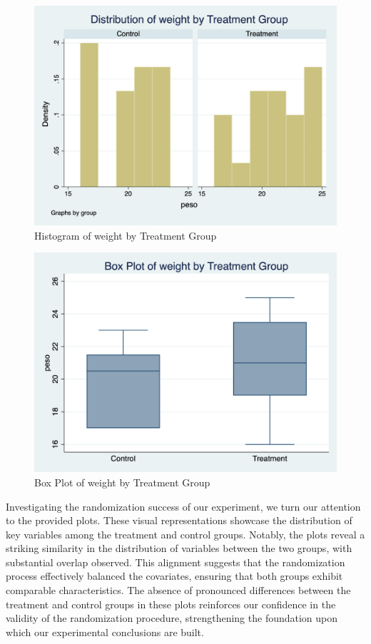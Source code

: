 \documentclass{article}
\begin{document}
\begin{figure}[!h]
\centering
\includegraphics[scale=0.30]{histogram_peso_trad.png}
\caption{Histogram of weight by Treatment Group}
\end{figure}

\begin{figure}[!h]
\centering
\includegraphics[scale=0.30]{box_plot_peso_trad.png}
\caption{Box Plot of weight by Treatment Group}
\end{figure}

Investigating the randomization success of our experiment, we turn our attention to the provided plots. These visual
representations showcase the distribution of key variables among the treatment and control groups. Notably, the plots
reveal a striking similarity in the distribution of variables between the two groups, with substantial overlap observed.
This alignment suggests that the randomization process effectively balanced the covariates, ensuring that both groups
exhibit comparable characteristics. The absence of pronounced differences between the treatment and control groups in
these plots reinforces our confidence in the validity of the randomization procedure, strengthening the foundation upon
which our experimental conclusions are built. 
\end{document}
